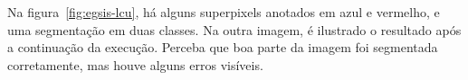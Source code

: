 \begin{figure}[!h]
\centering
    \captionsetup{width=14cm}

    \begin{subfigure}[b]{0.45\textwidth}
    \centering
    \caption{\label{fig:egsis-superpixels}}
    \end{subfigure}
\quad
    \begin{subfigure}[b]{0.45\textwidth}
    \centering
    \caption{\label{fig:egsis-complex-networks}}
    \end{subfigure}
    {\Fonte{\fonteautor}}
\quad
\end{figure}
\FloatBarrier{}



Na figura~\ref{fig:egsis-lcu}, há alguns superpixels
anotados em azul e vermelho, e uma segmentação em duas classes. Na outra
imagem, é ilustrado o resultado após a continuação da
execução. Perceba que boa parte da imagem foi segmentada corretamente, mas houve
alguns erros visíveis.

